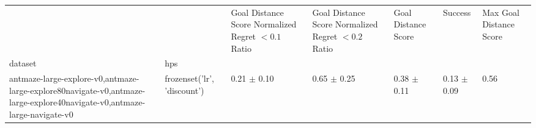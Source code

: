 \begin{tabular}{lllllll}
\toprule
 &  & Goal Distance Score Normalized Regret $< 0.1$ Ratio & Goal Distance Score Normalized Regret $< 0.2$ Ratio & Goal Distance Score & Success & Max Goal Distance Score \\
dataset & hps &  &  &  &  &  \\
\midrule
antmaze-large-explore-v0,antmaze-large-explore80navigate-v0,antmaze-large-explore40navigate-v0,antmaze-large-navigate-v0 & frozenset({'lr', 'discount'}) & 0.21 $\pm$ 0.10 & 0.65 $\pm$ 0.25 & 0.38 $\pm$ 0.11 & 0.13 $\pm$ 0.09 & 0.56 \\
\cline{1-7}
\bottomrule
\end{tabular}
